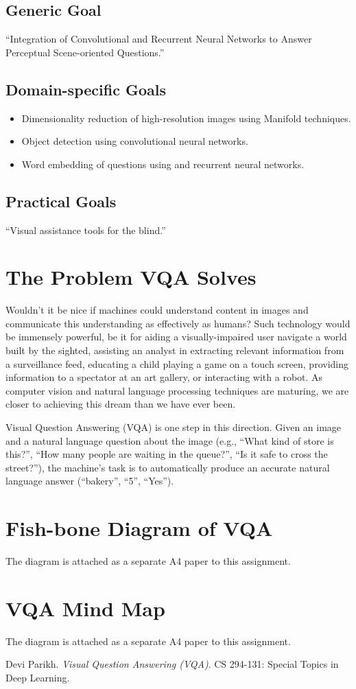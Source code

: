 \documentclass[12pt]{article}
\numberwithin{equation}{section}
\numberwithin{table}{section}
\numberwithin{figure}{section}
\begin{document}
\subsection*{Generic Goal}
``Integration of Convolutional and Recurrent Neural Networks to Answer Perceptual Scene-oriented Questions.''

\subsection*{Domain-specific Goals}
\begin{itemize}
	\item Dimensionality reduction of high-resolution images using Manifold techniques. 
	\item Object detection using convolutional neural networks.
	\item Word embedding of questions using  and recurrent neural networks.
\end{itemize}

\subsection*{Practical Goals}
``Visual assistance tools for the blind.''

\section{The Problem VQA Solves}
Wouldn’t it be nice if machines could understand content in images and communicate this understanding as effectively as humans? Such technology would be immensely powerful, be it for aiding a visually-impaired user navigate a world built by the sighted, assisting an analyst in extracting relevant information from a surveillance feed, educating a child playing a game on a touch screen, providing information to a spectator at an art gallery, or interacting with a robot. As computer vision and natural language processing techniques are maturing, we are closer to achieving this dream than we have ever been.

Visual Question Answering (VQA) is one step in this direction. Given an image and a natural language question about the image (e.g., “What kind of store is this?”, “How many people are waiting in the queue?”, “Is it safe to cross the street?”), the machine’s task is to automatically produce an accurate natural language answer (“bakery”, “5”, “Yes”).\cite{DEVI}

\section{Fish-bone Diagram of VQA}
The diagram is attached as a separate A4 paper to this assignment.

\section{VQA Mind Map}
The diagram is attached as a separate A4 paper to this assignment.

\begin{thebibliography}{9}
	Devi Parikh. 
	\textit{Visual Question Answering (VQA)}. CS 294-131: Special Topics in Deep Learning.

\end{thebibliography}
\end{document}
